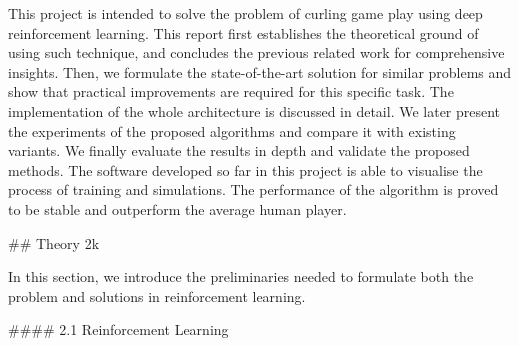 \documentclass[twoside,12pt,a4paper]{article}
\begin{document}
This project is intended to solve the problem of curling game play using deep reinforcement learning. This report first establishes the theoretical ground of using such technique, and concludes the previous related work for comprehensive insights. Then, we formulate the state-of-the-art solution for similar problems and show that practical improvements are required for this specific task. The implementation of the whole architecture is discussed in detail. We later present the experiments of the proposed algorithms and compare it with existing variants. We finally evaluate the results in depth and validate the proposed methods. The software developed so far in this project is able to visualise the process of training and simulations. The performance of the algorithm is proved to be stable and outperform the average human player.



## Theory 2k

In this section, we introduce the preliminaries needed to formulate both the problem and solutions in reinforcement learning.



#### 2.1 Reinforcement Learning
\end{document}
